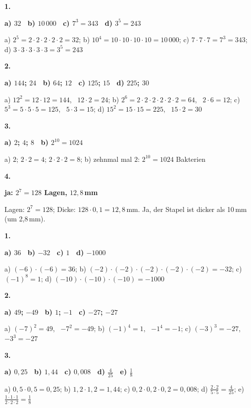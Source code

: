 \documentclass[11pt]{article}
\newcommand{\lsg}[3]{\par\noindent\begin{minipage}[t]{9mm}\textbf{#1}\end{minipage}%
  \begin{minipage}[t]{52mm}\raggedright\bfseries\boldmath #2\end{minipage}\hspace{3mm}%
  \begin{minipage}[t]{\dimexpr\linewidth-64mm\relax}\raggedright\small #3\end{minipage}\par\vspace{4pt}}
\begin{document}
\par\smallskip
{}\par
\par\Needspace{25mm}\vspace{6pt}\noindent\colorbox{black!12}{}\hspace{2mm}{\bfseries Potenz als Malkette}\par\vspace{4pt}
\lsg{1.}{a) $32$ \ b) $10\,000$ \ c) $7^3 = 343$ \ d) $3^5 = 243$}{a) $2^5 = 2 \cdot 2 \cdot 2 \cdot 2 \cdot 2 = 32$; b) $10^4 = 10 \cdot 10 \cdot 10 \cdot 10 = 10\,000$; c) $7 \cdot 7 \cdot 7 = 7^3 = 343$; d) $3 \cdot 3 \cdot 3 \cdot 3 \cdot 3 = 3^5 = 243$}
\lsg{2.}{a) $144$; $24$ \ b) $64$; $12$ \ c) $125$; $15$ \ d) $225$; $30$}{a) $12^2 = 12 \cdot 12 = 144$, \ $12 \cdot 2 = 24$; b) $2^6 = 2 \cdot 2 \cdot 2 \cdot 2 \cdot 2 \cdot 2 = 64$, \ $2 \cdot 6 = 12$; c) $5^3 = 5 \cdot 5 \cdot 5 = 125$, \ $5 \cdot 3 = 15$; d) $15^2 = 15 \cdot 15 = 225$, \ $15 \cdot 2 = 30$}
\lsg{3.}{a) $2$; $4$; $8$ \ b) $2^{10} = 1024$}{a) $2$; $2 \cdot 2 = 4$; $2 \cdot 2 \cdot 2 = 8$; b) zehnmal mal $2$: $2^{10} = 1024$ Bakterien}
\lsg{4.}{ja: $2^7 = 128$ Lagen, $12{,}8$\,mm}{Lagen: $2^7 = 128$; Dicke: $128 \cdot 0{,}1 = 12{,}8$\,mm. Ja, der Stapel ist dicker als 10\,mm (um 2,8\,mm).}
\par\Needspace{25mm}\vspace{6pt}\noindent\colorbox{black!12}{}\hspace{2mm}{\bfseries Minus und Komma in der Potenz}\par\vspace{4pt}
\lsg{1.}{a) $36$ \ b) $-32$ \ c) $1$ \ d) $-1000$}{a) $(-6) \cdot (-6) = 36$; b) $(-2) \cdot (-2) \cdot (-2) \cdot (-2) \cdot (-2) = -32$; c) $(-1)^8 = 1$; d) $(-10) \cdot (-10) \cdot (-10) = -1000$}
\lsg{2.}{a) $49$; $-49$ \ b) $1$; $-1$ \ c) $-27$; $-27$}{a) $(-7)^2 = 49$, \ $-7^2 = -49$; b) $(-1)^4 = 1$, \ $-1^4 = -1$; c) $(-3)^3 = -27$, \ $-3^3 = -27$}
\lsg{3.}{a) $0{,}25$ \ b) $1{,}44$ \ c) $0{,}008$ \ d) $\frac{4}{25}$ \ e) $\frac{1}{8}$}{a) $0{,}5 \cdot 0{,}5 = 0{,}25$; b) $1{,}2 \cdot 1{,}2 = 1{,}44$; c) $0{,}2 \cdot 0{,}2 \cdot 0{,}2 = 0{,}008$; d) $\frac{2 \cdot 2}{5 \cdot 5} = \frac{4}{25}$; e) $\frac{1 \cdot 1 \cdot 1}{2 \cdot 2 \cdot 2} = \frac{1}{8}$}
\end{document}
